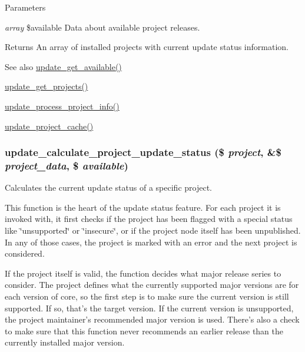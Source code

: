 \begin{DoxyParams}{Parameters}
\item[{\em array}]\$available Data about available project releases.\end{DoxyParams}
\begin{DoxyReturn}{Returns}
An array of installed projects with current update status information.
\end{DoxyReturn}
\begin{DoxySeeAlso}{See also}
\hyperlink{update_8module_a683663ab0739a0d67fe3eb98f532c11c}{update\_\-get\_\-available()} 

\hyperlink{update_8compare_8inc_a7e1ea49d91f2d2b81b8101d481d10300}{update\_\-get\_\-projects()} 

\hyperlink{update_8compare_8inc_ad14173209d3e9cf76fbd6d6d1977de05}{update\_\-process\_\-project\_\-info()} 

\hyperlink{update_8compare_8inc_a958705ecce49b020722280decff3f644}{update\_\-project\_\-cache()} 
\end{DoxySeeAlso}
\hypertarget{update_8compare_8inc_a964a0180687773bb39b53482d7106545}{
\subsubsection[{update\_\-calculate\_\-project\_\-update\_\-status}]{\setlength{\rightskip}{0pt plus 5cm}update\_\-calculate\_\-project\_\-update\_\-status (\$ {\em project}, \/  \&\$ {\em project\_\-data}, \/  \$ {\em available})}}
\label{update_8compare_8inc_a964a0180687773bb39b53482d7106545}
Calculates the current update status of a specific project.

This function is the heart of the update status feature. For each project it is invoked with, it first checks if the project has been flagged with a special status like \char`\"{}unsupported\char`\"{} or \char`\"{}insecure\char`\"{}, or if the project node itself has been unpublished. In any of those cases, the project is marked with an error and the next project is considered.

If the project itself is valid, the function decides what major release series to consider. The project defines what the currently supported major versions are for each version of core, so the first step is to make sure the current version is still supported. If so, that's the target version. If the current version is unsupported, the project maintainer's recommended major version is used. There's also a check to make sure that this function never recommends an earlier release than the currently installed major version.

